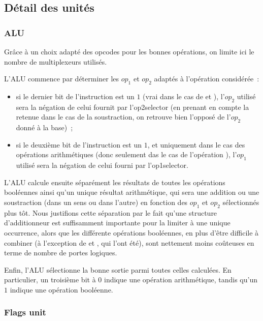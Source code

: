 \documentclass[11pt,a4paper]{article}
\newcommand{\relire}{}
\newcommand{\relu}[1]{}
\begin{document}
\subsection{Détail des unités}

\subsubsection{ALU} \label{sssec:procunit_alu}

\relire
\relu{Théo}

Grâce à un choix adapté des opcodes pour les bonnes opérations, on limite ici le nombre de multiplexeurs utilisés.

L'ALU commence par déterminer les $op_1$ et $op_2$ adaptés à l'opération considérée~:
\begin{itemize}

\item si le dernier bit de l'instruction est un $1$ (vrai dans le cas de  et ), l'$op_2$ utilisé sera la négation de celui fournit par l'op2selector (en prenant en compte la retenue dans le cas de la soustraction, on retrouve bien l'opposé de l'$op_2$ donné à la base)~;

\item si le deuxième bit de l'instruction est un $1$, et uniquement dans le cas des opérations arithmétiques (donc seulement das le cas de l'opération ), l'$op_1$ utilisé sera la négation de celui fourni par l'op1selector.

\end{itemize}

L'ALU calcule ensuite séparément les résultats de toutes les opérations booléennes ainsi qu'un unique résultat arithmétique, qui sera une addition ou une soustraction (dans un sens ou dans l'autre) en fonction des $op_1$ et $op_2$ sélectionnés plus tôt. Nous justifions cette séparation par le fait qu'une structure d'additionneur est suffisamment importante pour la limiter à une unique occurrence, alors que les différente opérations booléennes, en plus d'être difficile à combiner (à l'exception de  et , qui l'ont été), sont nettement moins coûteuses en terme de nombre de portes logiques.

Enfin, l'ALU sélectionne la bonne sortie parmi toutes celles calculées. En particulier, un troisième bit à $0$ indique une opération arithmétique, tandis qu'un $1$ indique une opération booléenne.

\subsubsection{Flags unit}
\end{document}
